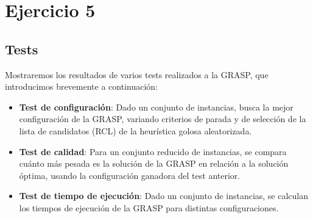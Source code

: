 \section{Ejercicio 5}

\subsection{Tests}
Mostraremos los resultados de varios tests realizados a la GRASP, que introducimos brevemente a continuación:
\begin{itemize}
    \item \textbf{Test de configuración}: Dado un conjunto de instancias, busca la mejor configuración de la GRASP, variando criterios de parada y de selección de la lista de candidatos (RCL) de la heurística golosa aleatorizada.
    \item \textbf{Test de calidad}: Para un conjunto reducido de instancias, se compara cuánto más pesada es la solución de la GRASP en relación a la solución óptima, usando la configuración ganadora del test anterior.
    \item \textbf{Test de tiempo de ejecución}: Dado un conjunto de instancias, se calculan los tiempos de ejecución de la GRASP para distintas configuraciones.
\end{itemize}

